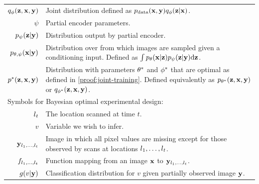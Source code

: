 \begin{table}
\begin{tabular}{rp{10cm}}
    $q_\phi({\mathbf{z}},{\mathbf{x}}, {\mathbf{y}})$                 & Joint distribution defined as $p_{\rm{data}} ({\mathbf{x}}, {\mathbf{y}})q_\phi({\mathbf{z}}|{\mathbf{x}})$. \\
    $\psi$                            & Partial encoder parameters. \\
    $p_\psi({\mathbf{z}}|{\mathbf{y}})$                 & Distribution output by partial encoder. \\
    $p_{\theta,\psi}({\mathbf{x}}|{\mathbf{y}})$             & Distribution over from which images are sampled given a conditioning input. Defined as $\int p_\theta({\mathbf{x}}|{\mathbf{z}})p_\psi({\mathbf{z}}|{\mathbf{y}}) \mathrm{d}{\mathbf{z}}$. \\
    ${p}^*{}({\mathbf{z}}, {\mathbf{x}}, {\mathbf{y}})$           & Distribution with parameters ${\theta}^*$ and ${\phi}^*$ that are optimal as defined in \cref{proof:joint-training}. Defined equivalently as $p_{{\theta}^*}({\mathbf{z}}, {\mathbf{x}}, {\mathbf{y}})$ or $q_{{\phi}^*}({\mathbf{z}},{\mathbf{x}},{\mathbf{y}})$.  \\
    \midrule
    \multicolumn{2}{l}{Symbols for Bayesian optimal experimental design:} \\
    $l{}_t$                                 & The location scanned at time $t$. \\
    $v$                                   & Variable we wish to infer. \\
    ${\mathbf{y}}_{l{}_1,\ldots,l{}_t}$             & Image in which all pixel values are missing except for those observed by scans at locations $l{}_1,\ldots,l{}_t$. \\
    $f_{l{}_1,\ldots,l{}_t}$                    & Function mapping from an image ${\mathbf{x}}$ to ${\mathbf{y}}_{l{}_1,\ldots,l{}_t}$. \\
    $g(v|{\mathbf{y}})$                       & Classification distribution for $v$ given partially observed image ${\mathbf{y}}$. \\
    \bottomrule
  \end{tabular}
  \vspace{-1em}
\end{table}


